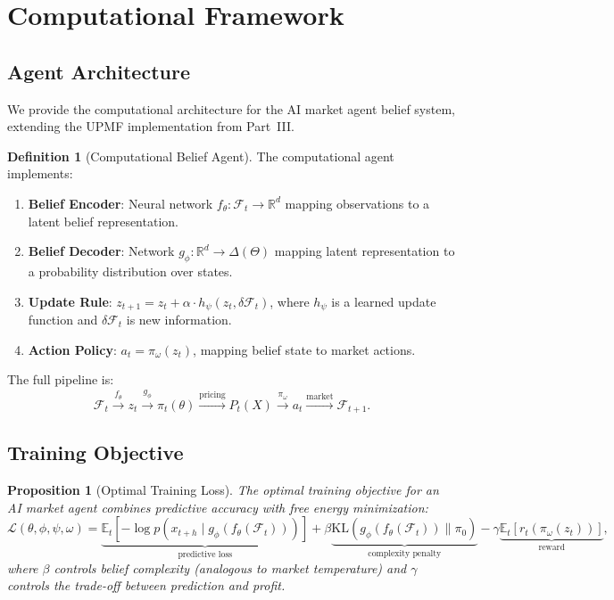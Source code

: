 \documentclass[12pt,a4paper]{article}
\newtheorem{proposition}[theorem]{Proposition}
\theoremstyle{definition}
\newtheorem{definition}[theorem]{Definition}
\newcommand{\E}{\mathbb{E}}
\newcommand{\R}{\mathbb{R}}
\newcommand{\F}{\mathcal{F}}
\newcommand{\KL}{\mathrm{KL}}
\begin{document}
\section{Computational Framework}\label{sec:computation}

\subsection{Agent Architecture}

We provide the computational architecture for the AI market agent belief system, extending the UPMF implementation from Part~III.

\begin{definition}[Computational Belief Agent]\label{def:comp-agent}
The computational agent implements:
\begin{enumerate}
  \item \textbf{Belief Encoder}: Neural network $f_\theta: \F_t \to \R^d$ mapping observations to a latent belief representation.
  \item \textbf{Belief Decoder}: Network $g_\phi: \R^d \to \Delta(\Theta)$ mapping latent representation to a probability distribution over states.
  \item \textbf{Update Rule}: $z_{t+1} = z_t + \alpha \cdot h_\psi(z_t, \delta\F_t)$, where $h_\psi$ is a learned update function and $\delta\F_t$ is new information.
  \item \textbf{Action Policy}: $a_t = \pi_\omega(z_t)$, mapping belief state to market actions.
\end{enumerate}
\end{definition}

The full pipeline is:
\begin{equation}
  \F_t \xrightarrow{f_\theta} z_t \xrightarrow{g_\phi} \pi_t(\theta) \xrightarrow{\text{pricing}} P_t(X) \xrightarrow{\pi_\omega} a_t \xrightarrow{\text{market}} \F_{t+1}.
\end{equation}

\subsection{Training Objective}

\begin{proposition}[Optimal Training Loss]\label{prop:training-loss}
The optimal training objective for an AI market agent combines predictive accuracy with free energy minimization:
\begin{equation}\label{eq:training-loss}
  \mathcal{L}(\theta, \phi, \psi, \omega) = \underbrace{\E_t\left[-\log p(x_{t+h} \mid g_\phi(f_\theta(\F_t)))\right]}_{\text{predictive loss}} + \beta \underbrace{\KL(g_\phi(f_\theta(\F_t)) \| \pi_0)}_{\text{complexity penalty}} - \gamma \underbrace{\E_t[r_t(\pi_\omega(z_t))]}_{\text{reward}},
\end{equation}
where $\beta$ controls belief complexity (analogous to market temperature) and $\gamma$ controls the trade-off between prediction and profit.
\end{proposition}
\end{document}
